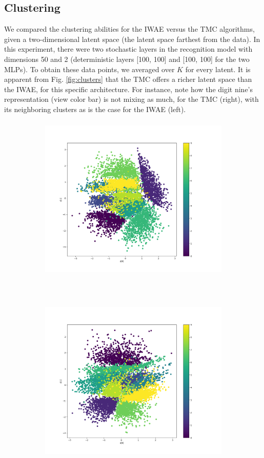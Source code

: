 \documentclass{article}
\begin{document}
\begin{appendices}
\section{Clustering}
\label{sec:clusters}
We compared the clustering abilities for the IWAE versus the TMC algorithms, given a two-dimensional latent space (the latent space farthest from the data). In this experiment, there were two stochastic layers in the recognition model with dimensions 50 and 2 (deterministic layers [100, 100] and [100, 100] for the two MLPs). To obtain these data points, we averaged over $K$ for every latent. It is apparent from Fig. \ref{fig:clusters} that the TMC offers a richer latent space than the IWAE, for this specific architecture. For instance, note how the digit nine's representation (view color bar) is not mixing as much, for the TMC (right), with its neighboring clusters as is the case for the IWAE (left).
\begin{figure}[h!]
    \centering
    \begin{subfigure}[t]{0.5\textwidth}
    \hspace*{-2cm}
        \centering
        \includegraphics[height=8cm]{Figures/Scatter_plot_iwae.png}
    \end{subfigure}%
    ~ 
    \begin{subfigure}[t]{0.5\textwidth}
        \centering
        \includegraphics[height=8cm]{Figures/Scatter_plot_tmc.png}

\end{subfigure}
\end{figure}
\end{appendices}
\end{document}
